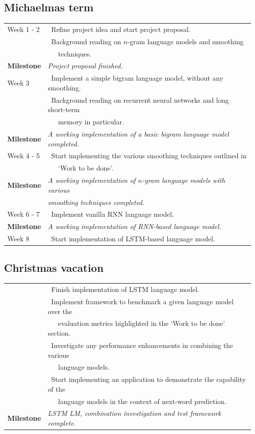 \documentclass[a4paper, 12pt]{article}
\newcommand{\tbf}[1]{\textbf{#1}}
\newcommand{\tit}[1]{\textit{#1}}
\newcommand{\bpt}[0]{\textbullet~}
\begin{document}
\subsection*{Michaelmas term}
\begin{tabular}{l | l}
	Week 1 - 2 & \bpt Refine project idea and start project proposal. \\
	& \bpt Background reading on $n$-gram language models and smoothing \\
	&~~~techniques. \\
	\tbf{Milestone} & \tit{Project proposal finished.} \\ \hline
	Week 3 & \bpt Implement a simple bigram language model, without any smoothing. \\
	& \bpt Background reading on recurrent neural networks and long short-term \\
	&~~~memory in particular. \\
	\tbf{Milestone} & \tit{A working implementation of a basic bigram language model completed.} \\ \hline
	Week 4 - 5 & \bpt Start implementing the various smoothing techniques outlined in \\
	&~~~`Work to be done'. \\
	\tbf{Milestone} & \tit{A working implementation of $n$-gram language models with various} \\
	& \tit{smoothing techniques completed.} \\ \hline
	Week 6 - 7 & \bpt Implement vanilla RNN language model. \\
	\tbf{Milestone} & \tit{A working implementation of RNN-based language model.} \\ \hline
	Week 8 & \bpt Start implementation of LSTM-based language model. \\
\end{tabular}

\subsection*{Christmas vacation}
\begin{tabular}{l | l}
	& \bpt Finish implementation of LSTM language model. \\
	& \bpt Implement framework to benchmark a given language model over the \\
	&~~~evaluation metrics highlighted in the `Work to be done' section. \\
	& \bpt Investigate any performance enhancements in combining the various \\
	&~~~language models. \\
	& \bpt Start implementing an application to demonstrate the capability of the \\
	&~~~language models in the context of next-word prediction. \\
	\tbf{Milestone} & \tit{LSTM LM, combination investigation and test framework complete.} \\
\end{tabular}
\end{document}
